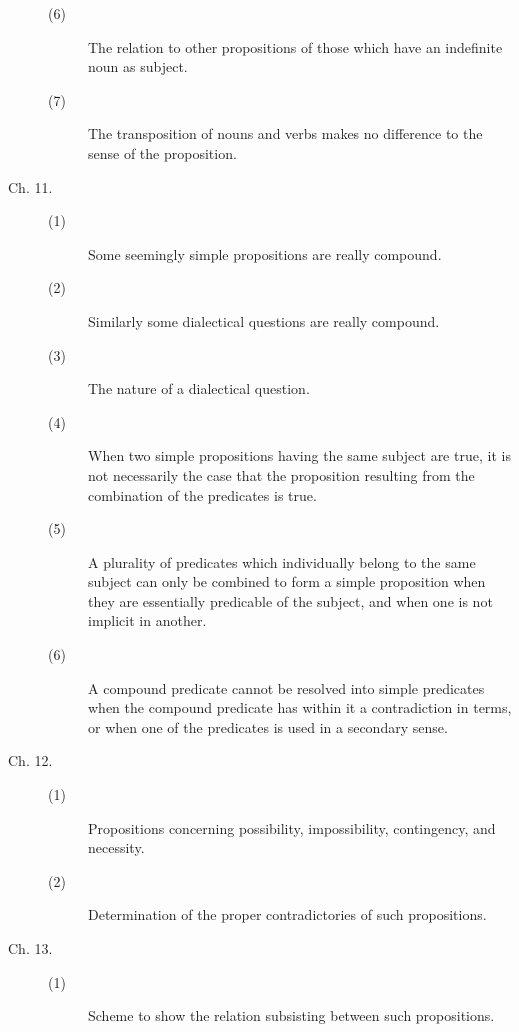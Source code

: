 \begin{description}
\begin{description}
\item[(6)] The relation to other propositions of those which have an indefinite noun as subject. 

\item[(7)] The transposition of nouns and verbs makes no difference to the sense of the proposition. 

\end{description}

\item[Ch. 11.]

\begin{description}
 \item[(1)] Some seemingly simple propositions are really compound. 

\item[(2)] Similarly some dialectical questions are really compound. 

\item[(3)] The nature of a dialectical question. 

\item[(4)] When two simple propositions having the same subject are true, 
it is not necessarily the case that the proposition resulting from 
the combination of the predicates is true.

\item[(5)] A plurality of predicates which individually belong to the same 
subject can only be combined to form a simple proposition when 
they are essentially predicable of the subject, and when one is 
not implicit in another. 

\item[(6)] A compound predicate cannot be resolved into simple predicates 
when the compound predicate has within it a contradiction in 
terms, or when one of the predicates is used in a secondary sense. 
\end{description}

\item[Ch. 12.]
\begin{description}
 \item[(1)] Propositions concerning possibility, impossibility, contingency, and necessity. 
\item[(2)] Determination of the proper contradictories of such propositions. 
\end{description}

\item[Ch. 13.]
\begin{description}
 \item[(1)] Scheme to show the relation subsisting between such propositions. 


\end{description}
\end{description}
